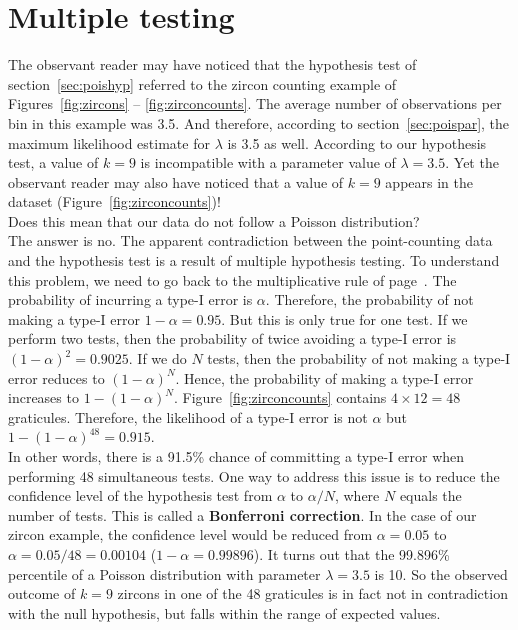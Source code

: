 \section{Multiple testing}
\label{sec:multipletesting}

The observant reader may have noticed that the hypothesis test of
section~\ref{sec:poishyp} referred to the zircon counting example of
Figures~\ref{fig:zircons} -- \ref{fig:zirconcounts}. The average
number of observations per bin in this example was 3.5. And therefore,
according to section~\ref{sec:poispar}, the maximum likelihood
estimate for $\lambda$ is 3.5 as well. According to our hypothesis
test, a value of $k=9$ is incompatible with a parameter value of
$\lambda=3.5$. Yet the observant reader may also have noticed that a
value of $k=9$ appears in the dataset
(Figure~\ref{fig:zirconcounts})!\\

Does this mean that our data do not follow a Poisson distribution?\\

The answer is no. The apparent contradiction between the
point-counting data and the hypothesis test is a result of multiple
hypothesis testing. To understand this problem, we need to go back to
the multiplicative rule of page~\pageref{page:multiplication}.  The
probability of incurring a type-I error is $\alpha$. Therefore, the
probability of not making a type-I error $1-\alpha=0.95$.  But this is
only true for one test. If we perform two tests, then the probability
of twice avoiding a type-I error is $(1-\alpha)^2=0.9025$. If we do
$N$ tests, then the probability of not making a type-I error reduces
to $(1-\alpha)^N$. Hence, the probability of making a type-I error
increases to $1-(1-\alpha)^N$. Figure~\ref{fig:zirconcounts} contains
${4}\times{12}=48$ graticules. Therefore, the likelihood of a type-I
error is not $\alpha$ but $1-(1-\alpha)^{48}=0.915$.\\

In other words, there is a 91.5\% chance of committing a type-I error
when performing 48 simultaneous tests. One way to address this issue
is to reduce the confidence level of the hypothesis test from $\alpha$
to $\alpha/N$, where $N$ equals the number of tests.  This is called a
\textbf{Bonferroni correction}. In the case of our zircon example, the
confidence level would be reduced from $\alpha=0.05$ to
$\alpha=0.05/48=0.00104$ ($1-\alpha=0.99896$).  It turns out that the
99.896\% percentile of a Poisson distribution with parameter
$\lambda=3.5$ is 10. So the observed outcome of $k=9$ zircons in one
of the 48 graticules is in fact not in contradiction with the null
hypothesis, but falls within the range of expected values.\\

